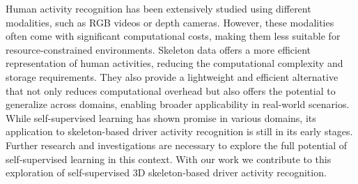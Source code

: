 Human activity recognition has been extensively studied using different modalities, such as RGB videos or depth cameras. However, these modalities often come with significant computational costs, making them less suitable for resource-constrained environments. 
Skeleton data offers a more efficient representation of human activities, reducing the computational complexity and storage requirements. They also provide a lightweight and efficient alternative that not only reduces computational overhead but also offers the potential to generalize across domains, enabling broader applicability in real-world scenarios. While self-supervised learning has shown promise in various domains, its application to skeleton-based driver activity recognition is still in its early stages. Further research and investigations are necessary to explore the full potential of self-supervised learning in this context. With our work we contribute to this exploration of self-supervised 3D skeleton-based driver activity recognition.

